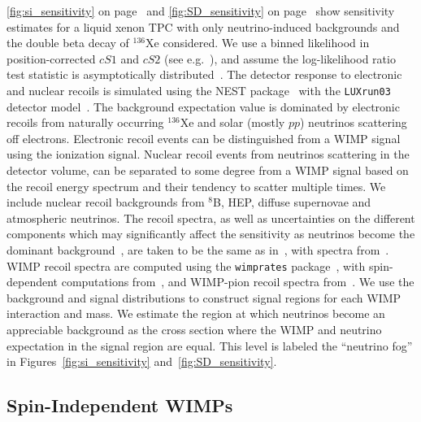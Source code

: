 \autoref{fig:si_sensitivity} on page~\pageref{fig:si_sensitivity} and \autoref{fig:SD_sensitivity} on page~\pageref{fig:SD_sensitivity} show sensitivity estimates for a liquid xenon TPC with only neutrino-induced backgrounds and the double beta decay of ${}^{136}$Xe considered. We use a binned likelihood in position-corrected $cS1$ and $cS2$ (see e.g.~\cite{Akerib:2017vbi,Aprile:2019bbb}), and assume the log-likelihood ratio test statistic is asymptotically distributed~\cite{Wilks:1938dza}. The detector response to electronic and nuclear recoils is simulated using the NEST package~\cite{Szydagis:2021hfh} with the \texttt{LUXrun03} detector model~\cite{szydagis_m_2018_1314669}. The background expectation value is dominated by electronic recoils from naturally occurring $^{136}$Xe and solar (mostly $pp$) neutrinos scattering off electrons. Electronic recoil events can be distinguished from a WIMP signal using the ionization signal. Nuclear recoil events from neutrinos scattering in the detector volume, can be separated to some degree from a WIMP signal based on the recoil energy spectrum and their tendency to scatter multiple times. We include nuclear recoil backgrounds from $^8$B, HEP, diffuse supernovae and atmospheric neutrinos. The recoil spectra, as well as uncertainties on the different components which may significantly affect the sensitivity as neutrinos become the dominant background~\cite{OHare:2020lva}, are taken to be the same as in~\cite{Aprile:2020vtw}, with spectra from~\cite{KotilaIachelloWebSite,Chen:2016eab,Billard:2013qya,Newstead:2020fie}. WIMP recoil spectra are computed using the \texttt{wimprates} package~\cite{wimprates}, with spin-dependent computations from~\cite{Klos:2013rwa}, and WIMP-pion recoil spectra from~\cite{Aprile:2018cxk}. We use the background and signal distributions to construct signal regions for each WIMP interaction and mass. We estimate the region at which neutrinos become an appreciable background as the cross section where the WIMP and neutrino expectation in the signal region are equal. This level is labeled the ``neutrino fog'' in Figures~\ref{fig:si_sensitivity} and~\ref{fig:SD_sensitivity}. 

\subsection{Spin-Independent WIMPs}\label{sec:si}

